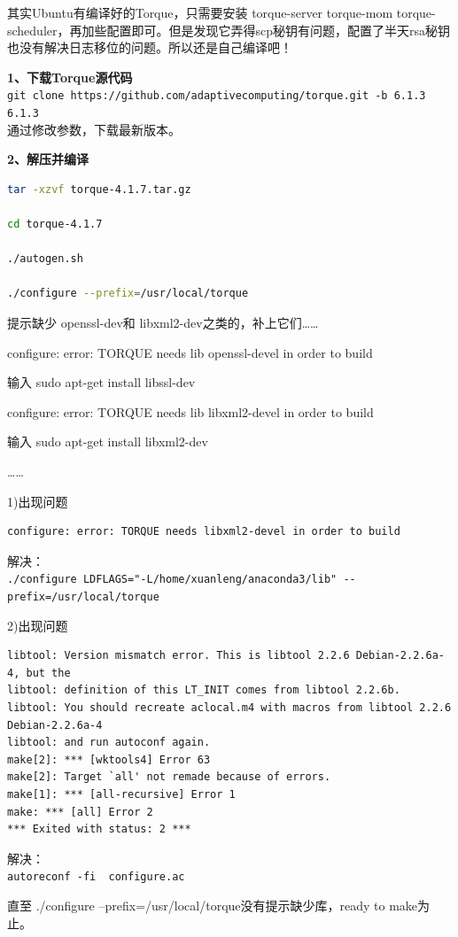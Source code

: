 {其实Ubuntu有编译好的Torque，只需要安装 torque-server torque-mom torque-scheduler，再加些配置即可。但是发现它弄得scp秘钥有问题，配置了半天rsa秘钥也没有解决日志移位的问题。所以还是自己编译吧！

\textbf{1、下载Torque源代码}\\
\verb|git clone https://github.com/adaptivecomputing/torque.git -b 6.1.3 6.1.3|\\
通过修改参数，下载最新版本。

\textbf{2、解压并编译}

\begin{lstlisting}[language=sh]
tar -xzvf torque-4.1.7.tar.gz

cd torque-4.1.7

./autogen.sh

./configure --prefix=/usr/local/torque
\end{lstlisting}

提示缺少 openssl-dev和 libxml2-dev之类的，补上它们……

configure: error: TORQUE needs lib openssl-devel in order to build

输入 sudo apt-get install libssl-dev

configure: error: TORQUE needs lib libxml2-devel in order to build

输入 sudo apt-get install libxml2-dev

……

1)出现问题
\begin{verbatim}
configure: error: TORQUE needs libxml2-devel in order to build
\end{verbatim}

解决：\\
\verb|./configure LDFLAGS="-L/home/xuanleng/anaconda3/lib" --prefix=/usr/local/torque|

2)出现问题
\begin{verbatim}
libtool: Version mismatch error. This is libtool 2.2.6 Debian-2.2.6a-4, but the
libtool: definition of this LT_INIT comes from libtool 2.2.6b.
libtool: You should recreate aclocal.m4 with macros from libtool 2.2.6 Debian-2.2.6a-4
libtool: and run autoconf again.
make[2]: *** [wktools4] Error 63
make[2]: Target `all' not remade because of errors.
make[1]: *** [all-recursive] Error 1
make: *** [all] Error 2
*** Exited with status: 2 ***
\end{verbatim}
解决：\\
\verb|autoreconf -fi  configure.ac |



直至 ./configure --prefix=/usr/local/torque没有提示缺少库，ready to make为止。

}
